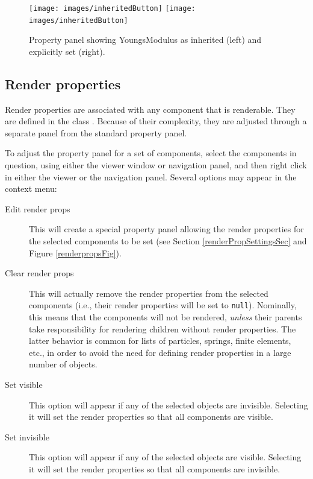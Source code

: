 \documentclass{article}
\begin{document}
\begin{figure}
\begin{center}
\iflatexml
\texttt{[image: images/inheritedButton]}
\else
\texttt{[image: images/inheritedButton]}
\fi
\end{center}
\caption{Property panel showing YoungsModulus as inherited (left) and 
explicitly set (right).}%
\label{inheritedButtonFig}
\end{figure}

\subsection{Render properties}

Render properties are associated with any component that is
renderable. They are defined in the class 
. 
Because of their complexity, they are adjusted
through a separate panel from the standard property panel.

To adjust the property panel for a set of components, select the components
in question, using either the viewer window or navigation panel, and then right 
click in either the viewer or the navigation panel. Several options may appear
in the context menu:

\begin{description}

\item[Edit render props]\mbox{}

This will create a special property panel allowing the render properties for
the selected components to be set (see Section \ref{renderPropSettingsSec}
and Figure \ref{renderpropsFig}).

\item[Clear render props]\mbox{}

This will actually remove the render properties
from the selected components (i.e., their render properties will be
set to {\tt null}).  Nominally, this means that the components will not be
rendered, {\it unless} their parents take responsibility for rendering
children without render properties. The latter behavior is common for
lists of particles, springs, finite elements, etc., in order to
avoid the need for defining render properties in a large number
of objects.

\item[Set visible]\mbox{}

This option will appear if any of the selected objects are
invisible. Selecting it will set the render properties so
that all components are visible.

\item[Set invisible]\mbox{}

This option will appear if any of the selected objects are
visible. Selecting it will set the render properties so
that all components are invisible.

\end{description}
\end{document}
